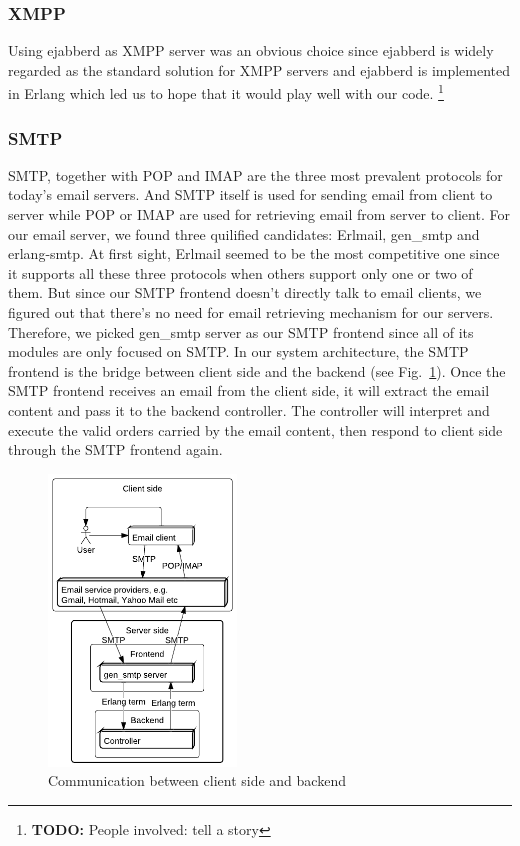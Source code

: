 \documentclass[11pt,a4paper]{report}
\newcommand{\todo}[1]{\footnote{{\color{red} {\bf TODO:} #1}}}
\begin{document}
\subsubsection{XMPP}
Using ejabberd as XMPP server was an obvious choice since ejabberd is widely
regarded as the standard solution for XMPP servers and ejabberd is implemented
in Erlang which led us to hope that it would play well with our code. \todo{People involved: tell a story}
\subsubsection{SMTP}
SMTP, together with POP and IMAP are the three most prevalent protocols for today's email servers.
And SMTP itself is used for sending email from client to server while POP or IMAP
are used for retrieving email from server to client.
For our email server, we found three quilified candidates: Erlmail, gen\_smtp and erlang-smtp.
At first sight, Erlmail seemed to be the most competitive one since it supports all these three
protocols when others support only one or two of them.
But since our SMTP frontend doesn't directly talk to email clients, we figured out
that there's no need for email retrieving mechanism for our servers. Therefore,
we picked gen\_smtp server as our SMTP frontend since all of its modules are only focused
on SMTP. In our system architecture, the SMTP frontend is the bridge between client side and the backend
(see Fig.~\ref{fig:smtp_arch}).
Once the SMTP frontend receives an email from the client side, it will extract the
email content and pass it to the backend controller. The controller will interpret and execute
the valid orders carried by the email content, then respond to client side through the SMTP frontend again.

\begin{figure}[h]
 \centering
 \includegraphics[width=5cm]{./graphics/smtp_arch.pdf}
 \caption{Communication between client side and backend}
 \label{fig:smtp_arch}
\end{figure}
\end{document}
